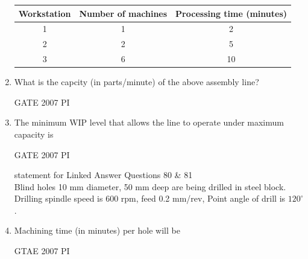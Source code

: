 \documentclass[journal,12pt,onecolumn]{IEEEtran}
\theoremstyle{remark}
\begin{document}
\begin{enumerate}
\begin{center}
\begin{tabular}{|c|c|c|}
\hline
{Workstation} & {Number of machines} & {Processing time (minutes)} \\ \hline
1 & 1 & 2 \\ \hline
2 & 2 & 5 \\ \hline
3 & 6 & 10 \\ \hline
\end{tabular}
\end{center}


\item 
What is the capcity (in parts/minute) of the above assembly line?

\hfill{GATE 2007 PI}
\begin{enumerate}
\end{enumerate}

\item 
The minimum WIP level that allows the line to operate under maximum capacity is 

\hfill{GATE 2007 PI}
\begin{enumerate}
    \end{enumerate}
    {statement for Linked Answer Questions 80 \& 81}\\
    
    Blind holes 10 mm diameter, 50 mm deep are being drilled in steel block. Drilling spindle speed is 600 rpm, feed 0.2 mm/rev, Point angle of drill is $120^{\circ}$.\\
    
    
    \item 
    Machining time (in minutes) per hole will be

    \hfill{GTAE 2007 PI}
\begin{enumerate}
    \end{enumerate}
    

\end{enumerate}
\end{document}
